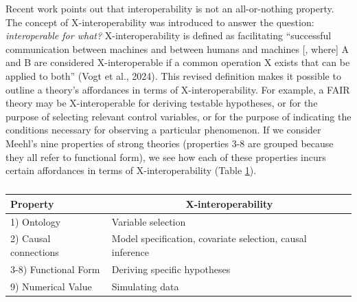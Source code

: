 \documentclass[
  man,floatsintext]{apa6}
\begin{document}
Recent work points out that interoperability is not an all-or-nothing property.
The concept of X-interoperability was introduced to answer the question: \emph{interoperable for what?}
X-interoperability is defined as facilitating ``successful communication between machines and between humans and machines {[}, where{]} A and B are considered X-interoperable if a common operation X exists that can be applied to both'' (Vogt et al., 2024).
This revised definition makes it possible to outline a theory's affordances in terms of X-interoperability.
For example, a FAIR theory may be X-interoperable for deriving testable hypotheses,
or for the purpose of selecting relevant control variables,
or for the purpose of indicating the conditions necessary for observing a particular phenomenon.
If we consider Meehl's nine properties of strong theories (properties 3-8 are grouped because they all refer to functional form),
we see how each of these properties incurs certain affordances in terms of X-interoperability (Table \ref{tab:tabmeehl}).

\begin{table}[tbp]

\begin{center}
\begin{threeparttable}

\caption{\label{tab:tabmeehl}}

\begin{tabular}{ll}
\toprule
Property & \multicolumn{1}{c}{X-interoperability}\\
\midrule
1) Ontology & Variable selection\\
2) Causal connections & Model specification, covariate selection, causal inference\\
3-8) Functional Form & Deriving specific hypotheses\\
9) Numerical Value & Simulating data\\
\bottomrule
\end{tabular}

\end{threeparttable}
\end{center}

\end{table}
\end{document}
